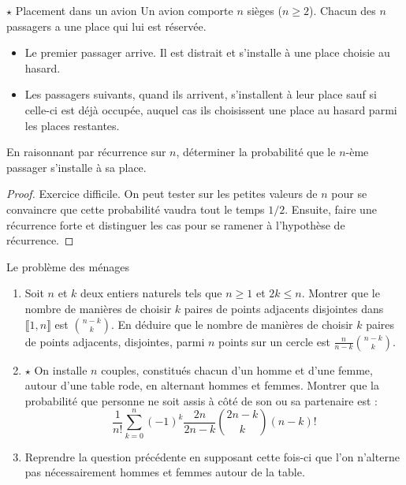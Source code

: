 \documentclass[french,a4paper]{article}
\theoremstyle{plain}
\theoremstyle{definition}
\theoremstyle{remark}
\begin{document}
\begin{ex}[Moulin.14 / X]{$\star$ Placement dans un avion}
	Un avion comporte $n$ sièges ($n\geqslant 2$). Chacun des $n$ passagers a une place qui lui est réservée.
	\begin{itemize}
		\item Le premier passager arrive. Il est distrait et s'installe à une place choisie au hasard.
		\item Les passagers suivants, quand ils arrivent, s'installent à leur place sauf si celle-ci est déjà occupée, auquel cas ils choisissent une place au hasard parmi les places restantes.
	\end{itemize}
	En raisonnant par récurrence sur $n$, déterminer la probabilité que le $n$-ème passager s'installe à sa place.
\end{ex}
\begin{proof}
	Exercice difficile. On peut tester sur les petites valeurs de $n$ pour se convaincre que cette probabilité vaudra tout le temps $1/2$. Ensuite, faire une récurrence forte et distinguer les cas pour se ramener à l'hypothèse de récurrence.
\end{proof}

\begin{ex}[Moulin.15]{Le problème des ménages}
	\begin{enumerate}
		\item Soit $n$ et $k$ deux entiers naturels tels que $n\geqslant 1$ et $2k\leqslant n$. Montrer que le nombre de manières de choisir $k$ paires de points adjacents disjointes dans $\llbracket1,n\rrbracket$ est $\displaystyle\binom{n-k}{k}$. En déduire que le nombre de manières de choisir $k$ paires de points adjacents, disjointes, parmi $n$ points sur un cercle est $\displaystyle\frac{n}{n-k}\binom{n-k}{k}$.
		\item $\star$ On installe $n$ couples, constitués chacun d'un homme et d'une femme, autour d'une table rode, en alternant hommes et femmes. Montrer que la probabilité que personne ne soit assis à côté de son ou sa partenaire est : $$\frac{1}{n!}\sum_{k=0}^{n}(-1)^k\frac{2n}{2n-k}\binom{2n-k}{k}(n-k)!$$
		\item Reprendre la question précédente en supposant cette fois-ci que l'on n'alterne pas nécessairement hommes et femmes autour de la table.
	\end{enumerate}
\end{ex}
\end{document}
